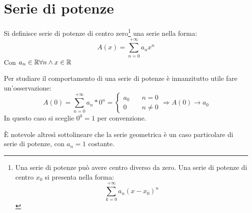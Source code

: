 %
%
%
%


\section{Serie di potenze}
\begin{defin}
	Si definisce serie di potenze di centro zero\footnote{Una serie di potenze può avere centro diverso da zero. Una serie di potenze di centro $x_0$ si presenta nella forma:
		\[
			\sum_{k=0}^{+\infty} a_n (x-x_0)^n
		\]} una serie nella forma:
	\[
		A(x)=\sum_{n=0}^{+\infty} a_n x^n
	\]
	Con $a_n\in\mathbb{R}\forall n\land x\in\mathbb{R}$
\end{defin}
Per studiare il comportamento di una serie di potenze è innanzitutto utile fare un'osservazione:
\[
	A(0)=\sum_{n=0}^{+\infty} a_n*0^n=
	\begin{cases}
		a_0\quad & n=0    \\
		0 \quad  & n\neq0
	\end{cases}\Rightarrow A(0)\to a_0
\]
In questo caso si sceglie $0^0=1$ per convenzione.

È notevole altresì sottolineare che la serie geometrica è un caso particolare di serie di potenze, con $a_n=1$ costante.

